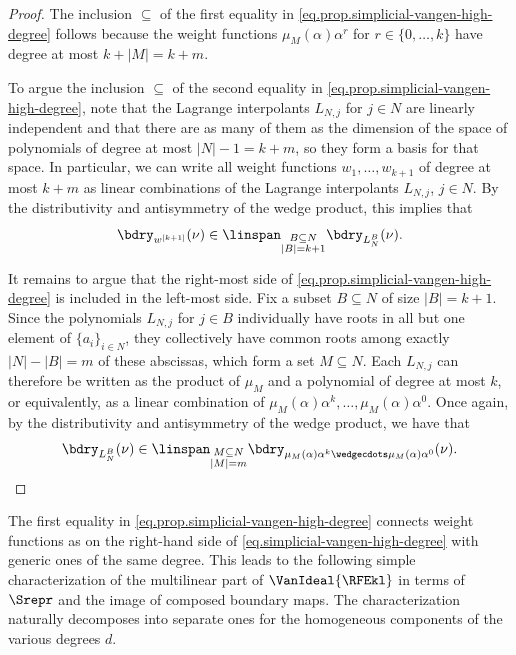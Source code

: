 \documentclass{toc}
\begin{document}
\begin{proof}
The inclusion $\subseteq$ of the first equality in \eqref{eq.prop.simplicial-vangen-high-degree} follows because the weight functions $\mu_M(\alpha) \alpha^r$ for $r \in \{0,\dots,k\}$ have degree at most $k+|M|=k+m$. 

To argue the inclusion $\subseteq$ of the second equality in \eqref{eq.prop.simplicial-vangen-high-degree}, note that the Lagrange interpolants $L_{N,j}$ for $j \in N$ are linearly independent and that there are as many of them as the dimension of the space of polynomials of degree at most $|N|-1=k+m$, so they form a basis for that space. In particular, we can write all weight functions $w_1,\dots,w_{k+1}$ of degree at most $k+m$ as linear combinations of the Lagrange interpolants $L_{N,j}$, $j \in N$. By the distributivity and antisymmetry of the wedge product, this implies that
\begin{equation*}
\bdry_{w^{[k+1]}}(\nu)  \in 
\linspan_{\substack{B \subseteq N \\ |B|=k+1}} \bdry_{L_N^B}(\nu).
\end{equation*}

It remains to argue that the right-most side of \eqref{eq.prop.simplicial-vangen-high-degree} is included in the left-most side. Fix a subset $B \subseteq N$ of size $|B|=k+1$. Since the polynomials $L_{N,j}$ for $j \in B$ individually have roots in all but one element of $\{a_i\}_{i \in N}$, they collectively have common roots among exactly $|N|-|B|=m$ of these abscissas, which form a set $M \subseteq N$. Each $L_{N,j}$ can therefore be written as the product of $\mu_M$ and a polynomial of degree at most $k$, or equivalently, as a linear combination of $\mu_{M}(\alpha)\alpha^k,\dots,\mu_{M}(\alpha)\alpha^0$. Once again, by the distributivity and antisymmetry of the wedge product, we have that 
\begin{equation*}
\bdry_{L_N^B}(\nu) \in 
\linspan_{\substack{M \subseteq N \\ |M|=m}}
\bdry_{\mu_M(\alpha)\alpha^k\wedgecdots\mu_M(\alpha)\alpha^0}(\nu).
\qedhere
\end{equation*}
\end{proof}

The first equality in \eqref{eq.prop.simplicial-vangen-high-degree} connects weight functions as on the right-hand side of \eqref{eq.simplicial-vangen-high-degree} with generic ones of the same degree. This leads to the following simple characterization of the multilinear part of $\VanIdeal{\RFEkl}$ in terms of $\Srepr$ and the image of composed boundary maps. The characterization naturally decomposes into separate ones for the homogeneous components of the various degrees $d$. 
\end{document}
